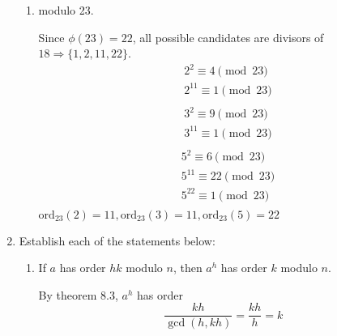 \documentclass[12pt]{exam}
\theoremstyle{definition}
\begin{document}
\begin{enumerate}
\begin{enumerate}
                  \item modulo 23.
                  \begin{answer}
                        Since $\phi(23) = 22$, all possible candidates are divisors 
                        of\newline $18 \Rightarrow \{1, 2, 11, 22\}$.
                        \[
                              \begin{aligned}
                                    &2^2 \equiv 4 \pmod {23}\\
                                    &2^{11} \equiv 1 \pmod {23}\\
                              \end{aligned}
                        \]
                        \[
                              \begin{aligned}
                                    &3^2 \equiv 9 \pmod {23}\\
                                    &3^{11} \equiv 1 \pmod {23}\\
                              \end{aligned}
                        \]
                        \[
                              \begin{aligned}
                                    &5^2 \equiv 6 \pmod {23}\\
                                    &5^{11} \equiv 22 \pmod {23}\\
                                    &5^{22} \equiv 1 \pmod {23}\\
                              \end{aligned}
                        \]
                        $\text{ord}_{23}(2) = 11, \text{ord}_{23}(3) = 11, \text{ord}_{23}(5) = 22$
                  \end{answer}
            \end{enumerate}
      \item Establish each of the statements below:
      \begin{enumerate}
            \item If $a$ has order $hk$ modulo $n$, then $a^h$ has order $k$ modulo $n$.
            \begin{answer}
                  By theorem 8.3, $a^h$ has order
                  \[
                        \frac{kh}{\gcd(h, kh)} = \frac{kh}{h} = k
                  \]
            \end{answer}


\end{enumerate}
\end{enumerate}
\end{document}
